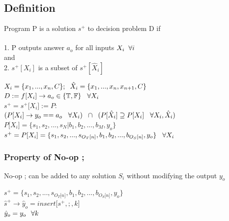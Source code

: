 \documentclass[11pt]{article}
\begin{document}
\subsection{Definition}
Program P is a solution $s^{+}$ to decision problem D if \\\\
1. P outputs answer $a_o$ for all inputs $X_i \hspace{2mm} \forall i$\\
and \\
2. $s^{+}[X_i]$ is a subset of $s^{+}[\hat{X}_i]$
\begin{center}
\vspace{2mm}
$
X_i = \{x_1,...,x_n,C\}; \hspace{2mm} \hat{X}_i = \{x_1,...,x_n,x_{n+1},C\}
$
\\ \vspace{2mm}
$
D := f \lbrack X_i \rbrack \rightarrow a_{o} \in \{\mathbb{T}, \mathbb{F}\} \hspace{3mm} \forall X_i
$
\\ \vspace{2mm}
$
s^+ = s^+\lbrack X_i \rbrack := P :
$
\\ \vspace{2mm}
$
(P \lbrack X_i \rbrack \rightarrow y_{o} == a_{o} \hspace{3mm} \forall X_i) \hspace{2mm} \cap \hspace{2mm} (P[\hat{X}_i] \supseteq P[X_i] \hspace{3mm} \forall X_i,\hat{X}_i)
$
\\ \vspace{4mm}
$
P \lbrack X_i \rbrack = \{ s_1,s_2,...,s_N| b_1, b_2,...,b_M,y_o\}
$
\\ \vspace{3mm}
$
s^+ = P \lbrack X_i \rbrack = \{ s_1,s_2,...,s_{O_T \lbrack n \rbrack }, b_1, b_2,...,b_{O_S \lbrack n \rbrack},y_o \} \hspace{3mm} \forall X_i
$
\end{center}





\subsubsection{Property of No-op ;}
No-op ; can be added to any solution $S_i$ without modifying the output $y_o$
\begin{center}
$
s^+ = \{ s_1,s_2,...,s_{O_T \lbrack n \rbrack }, b_1, b_2,...,b_{O_S \lbrack n \rbrack},y_o\}
$
\\ \vspace{2mm}
$
\hat{s}^+ \rightarrow \hat{y}_o = insert \lbrack s^+,;,k \rbrack
$
\\ \vspace{2mm}
$
\hat{y}_o = y_o \hspace{2.5mm} \forall k
$
\end{center}
\end{document}
